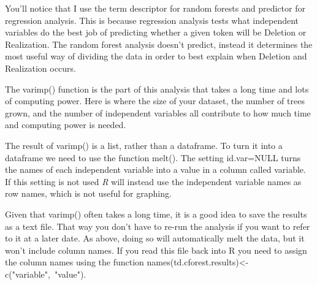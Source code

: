 \documentclass[
  10pt,
  letterpaper]{article}
\renewcommand\texttt[1]{{\ttfamily\color{BrickRed}#1}}
\begin{document}
\begin{tcolorbox}[enhanced jigsaw, rightrule=.15mm, left=2mm, toprule=.15mm, breakable, colback=white, colframe=quarto-callout-note-color-frame, leftrule=.75mm, bottomtitle=1mm, title=\textcolor{quarto-callout-note-color}{\faInfo}\hspace{0.5em}{Note}, colbacktitle=quarto-callout-note-color!10!white, coltitle=black, arc=.35mm, titlerule=0mm, bottomrule=.15mm, toptitle=1mm, opacityback=0, opacitybacktitle=0.6]

You'll notice that I use the term descriptor for random forests and
predictor for regression analysis. This is because regression analysis
tests what independent variables do the best job of predicting whether a
given token will be \texttt{Deletion} or \texttt{Realization}. The
random forest analysis doesn't predict, instead it determines the most
useful way of dividing the data in order to best explain when
\texttt{Deletion} and \texttt{Realization} occurs.

\end{tcolorbox}

The \texttt{varimp()} function is the part of this analysis that takes a
long time and lots of computing power. Here is where the size of your
dataset, the number of trees grown, and the number of independent
variables all contribute to how much time and computing power is needed.

The result of \texttt{varimp()} is a list, rather than a dataframe. To
turn it into a dataframe we need to use the function \texttt{melt()}.
The setting \texttt{id.var=NULL} turns the names of each independent
variable into a value in a column called \texttt{variable}. If this
setting is not used \emph{R} will instead use the independent variable
names as row names, which is not useful for graphing.

Given that \texttt{varimp()} often takes a long time, it is a good idea
to save the results as a text file. That way you don't have to re-run
the analysis if you want to refer to it at a later date. As above, doing
so will automatically melt the data, but it won't include column names.
If you read this file back into \texttt{R} you need to assign the column
names using the function
\texttt{names(td.cforest.results)\textless{}-c("variable",\ "value")}.
\end{document}
